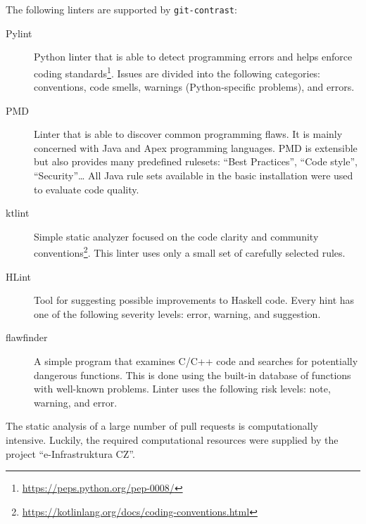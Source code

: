 \documentclass[digital,oneside,oldtable,nolof,nolot,nocover]{fithesis4}
\begin{document}
The following linters are supported by \texttt{git-contrast}:
\begin{description}
\item[{Pylint}] Python linter that is able to detect programming errors and helps
enforce coding standards\footnote{\url{https://peps.python.org/pep-0008/}}.
Issues are divided into the following categories: conventions, code smells,
warnings (Python-specific problems), and errors.
\item[{PMD}] Linter that is able to discover common programming flaws. It is mainly
concerned with Java and Apex programming languages. PMD is extensible but also
provides many predefined rulesets: ``Best Practices'', ``Code style'', ``Security''\dots{}
All Java rule sets available in the basic installation were used to evaluate code quality.
\item[{ktlint}] Simple static analyzer focused on the code clarity and community
conventions\footnote{\url{https://kotlinlang.org/docs/coding-conventions.html}}.
This linter uses only a small set of carefully selected rules.
\item[{HLint}] Tool for suggesting possible improvements to Haskell code.
Every hint has one of the following severity levels: error, warning, and suggestion.
\item[{flawfinder}] A simple program that examines C/C++ code and searches for potentially
dangerous functions. This is done using the built-in database of functions with
well-known problems. Linter uses the following risk levels: note, warning, and error.
\end{description}

The static analysis of a large number of pull requests is computationally intensive.
Luckily, the required computational resources were supplied by the project ``e-Infrastruktura CZ''.
\FloatBarrier
\end{document}
